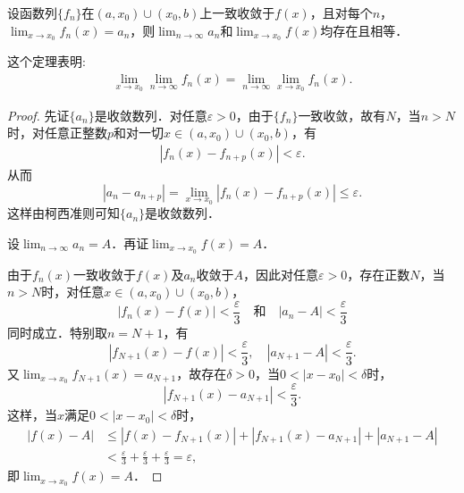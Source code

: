 \documentclass[../../main.tex]{subfiles}%
\begin{document}
\begin{theorem}\label{theorem:定理13.8123}
设函数列\(\{f_n\}\)在\((a, x_0) \cup (x_0, b)\)上一致收敛于\(f(x)\)，且对每个\(n\)，\(\lim_{x \to x_0} f_n(x) = a_n\)，则\(\lim_{n \to \infty} a_n\)和\(\lim_{x \to x_0} f(x)\)均存在且相等．
\end{theorem}
\begin{remark}
这个定理表明:
\begin{align*}
\underset{x\rightarrow x_0}{\lim}\underset{n\rightarrow \infty}{\lim}f_n\left( x \right) =\underset{n\rightarrow \infty}{\lim}\underset{x\rightarrow x_0}{\lim}f_n\left( x \right) .
\end{align*}
\end{remark}
\begin{proof}

先证\(\{a_n\}\)是收敛数列．对任意\(\varepsilon > 0\)，由于\(\{f_n\}\)一致收敛，故有\(N\)，当\(n > N\)时，对任意正整数\(p\)和对一切\(x \in (a, x_0) \cup (x_0, b)\)，有
\begin{align}
|f_n(x) - f_{n + p}(x)| < \varepsilon. \label{eq::--1}
\end{align}
从而
\[
|a_n - a_{n + p}| = \lim_{x \to x_0} |f_n(x) - f_{n + p}(x)| \leqslant \varepsilon.
\]
这样由柯西准则可知\(\{a_n\}\)是收敛数列．

设\(\lim_{n \to \infty} a_n = A\)．再证\(\lim_{x \to x_0} f(x) = A\)．

由于\(f_n(x)\)一致收敛于\(f(x)\)及\(a_n\)收敛于\(A\)，因此对任意\(\varepsilon > 0\)，存在正数\(N\)，当\(n > N\)时，对任意\(x \in (a, x_0) \cup (x_0, b)\)，
\[
|f_n(x) - f(x)| < \frac{\varepsilon}{3} \quad \text{和} \quad |a_n - A| < \frac{\varepsilon}{3}
\]
同时成立．特别取\(n = N + 1\)，有
\[
|f_{N + 1}(x) - f(x)| < \frac{\varepsilon}{3}, \quad |a_{N + 1} - A| < \frac{\varepsilon}{3}.
\]
又\(\lim_{x \to x_0} f_{N + 1}(x) = a_{N + 1}\)，故存在\(\delta > 0\)，当\(0 < |x - x_0| < \delta\)时，
\[
|f_{N + 1}(x) - a_{N + 1}| < \frac{\varepsilon}{3}.
\]
这样，当\(x\)满足\(0 < |x - x_0| < \delta\)时，
\begin{align*}
|f(x) - A| &\leqslant |f(x) - f_{N + 1}(x)| + |f_{N + 1}(x) - a_{N + 1}| + |a_{N + 1} - A| \\
&< \frac{\varepsilon}{3} + \frac{\varepsilon}{3} + \frac{\varepsilon}{3} = \varepsilon,
\end{align*}
即\(\lim_{x \to x_0} f(x) = A\)．

\end{proof}
\end{document}
